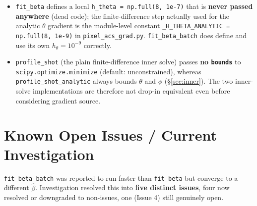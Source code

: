 \documentclass[11pt,a4paper]{article}
\newcommand{\code}[1]{\texttt{#1}}
\begin{document}
\begin{itemize}
\begin{itemize}
        leftover from the port-summed API in \code{crb\_signal.py} and has
        no effect on this script's behaviour.
      \item \code{fit\_beta} defines a local \code{h\_theta = np.full(8,
        1e-7)} that is \textbf{never passed anywhere} (dead code); the
        finite-difference step actually used for the analytic $\theta$
        gradient is the module-level constant
        \code{\_H\_THETA\_ANALYTIC = np.full(8, 1e-9)} in
        \code{pixel\_acs\_grad.py}. \code{fit\_beta\_batch} does define
        and use its own $h_\theta=10^{-9}$ correctly.
      \item \code{profile\_shot} (the plain finite-difference inner solve)
        passes \textbf{no \code{bounds}} to \code{scipy.optimize.minimize}
        (default: unconstrained), whereas \code{profile\_shot\_analytic}
        always bounds $\theta$ and $\phi$ (\S\ref{sec:inner}). The two
        inner-solve implementations are therefore not drop-in equivalent
        even before considering gradient source.
    \end{itemize}
\end{itemize}

\section{Known Open Issues / Current Investigation}
\label{sec:issues}

\code{fit\_beta\_batch} was reported to run faster than \code{fit\_beta}
but converge to a different $\hat\beta$. Investigation resolved this into
\textbf{five distinct issues}, four now resolved or downgraded to
non-issues, one (Issue 4) still genuinely open.
\end{document}
